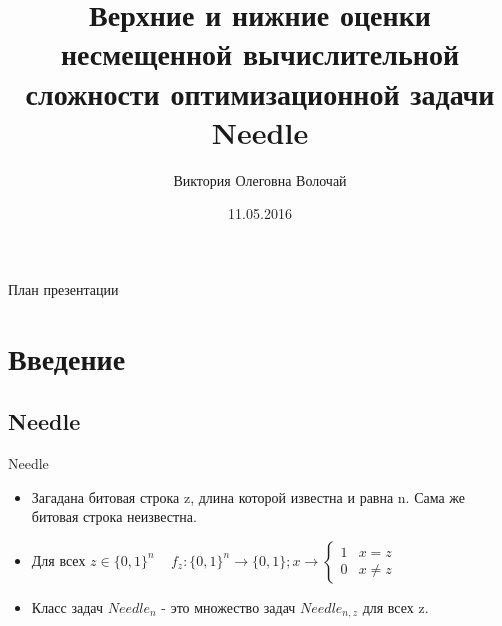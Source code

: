 \documentclass{beamer}
\begin{document}
\title[Оценки задачи Needle]{Верхние и нижние оценки несмещенной вычислительной сложности
оптимизационной задачи Needle}

\author[Волочай В.О.] {Виктория Олеговна Волочай}


\date{11.05.2016}

\subject{Theoretical Computer Science}

\begin{frame}
  \titlepage
\end{frame}

 \begin{frame}{План презентации}
  \tableofcontents
 \end{frame}

 \section{Введение}
 
 \subsection{Needle}
 \begin{frame}{Needle}
  \begin{itemize}
   \item Загадана битовая строка z, длина которой известна и равна n. Сама же битовая строка неизвестна.
   \item  Для всех $z \in \{0, 1\}^n \;\;\; $  
    \begin{math} 
    f_{z} : \{0, 1 \}^n \rightarrow \{0,1\}; x \rightarrow  \left\{ \begin{array}{ll}
    1 & \textrm{$x = z$}\\
    0 & \textrm{$x \ne z$}
    \end{array} \right.
    \end{math}

   \item Класс задач $Needle_n$ - это множество задач $Needle_{n, z}$ для всех z.
   \end{itemize} 
 \end{frame}
\end{document}
